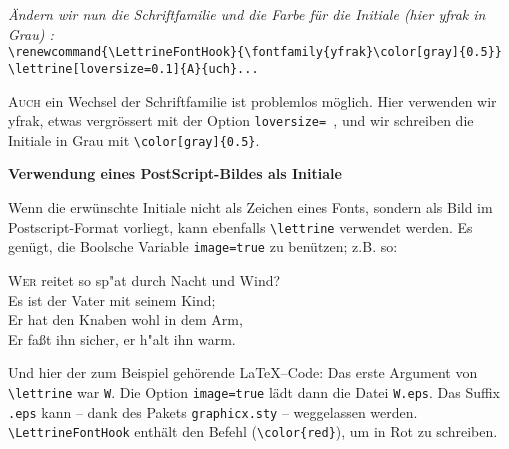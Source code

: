 \documentclass[12pt,a4paper]{article}
\begin{document}
\vspace{\baselineskip}
\textit{\"Andern wir nun die Schriftfamilie und die Farbe f\"ur die Initiale
(hier yfrak in Grau) :}\\
\verb+\renewcommand{\LettrineFontHook}{\fontfamily{yfrak}\color[gray]{0.5}}+\\
\verb+\lettrine[loversize=0.1]{A}{uch}...+

{%
\renewcommand{\LettrineFontHook}{\fontfamily{yfrak}\color[gray]{0.5}}

\lettrine[loversize=0.1]{A}{uch} ein Wechsel der
Schriftfamilie ist problemlos m\"oglich. Hier verwenden wir yfrak,
etwas vergr\"ossert mit der Option \verb+loversize= +, und wir schreiben
die Initiale in Grau mit \verb+\color[gray]{0.5}+.
\par}

\newpage
\begin{center}
\large\bfseries Verwendung eines PostScript-Bildes als Initiale
\end{center}

\vspace{\baselineskip} Wenn die erw\"unschte Initiale nicht als Zeichen eines
Fonts, sondern als Bild im Postscript-Format vorliegt, kann ebenfalls
\verb+\lettrine+ verwendet werden. Es gen\"ugt, 
die Boolsche Variable \texttt{image=true} zu ben\"utzen; z.B. so:

\vspace{.5\baselineskip}
{%
\selectfont\Large
\renewcommand{\LettrineTextFont}{\relax}
\renewcommand{\LettrineFontHook}{\color{red}}
\lettrine[image=true, lines=3, lhang=.2, loversize=.25, %
          lraise=-.05, findent=0.1em, nindent=0em]
{W}{er} reitet so sp"at durch Nacht und Wind?\\
Es ist der Vater mit seinem Kind;\\
Er hat den Knaben wohl in dem Arm,\\
Er fa{\ss}t ihn sicher, er h"alt ihn warm.
\par}

\vspace{\baselineskip} Und hier der zum Beispiel geh\"orende \LaTeX{}--Code:
Das erste Argument von \verb+\lettrine+ war \verb+W+. Die Option \texttt{image=true}
l\"adt dann die Datei \verb+W.eps+. Das Suffix \verb+.eps+ kann -- dank des
Pakets \verb+graphicx.sty+ -- weggelassen werden. \verb+\LettrineFontHook+
enth\"alt den Befehl (\verb+\color{red}+), um in Rot zu schreiben.
\end{document}
